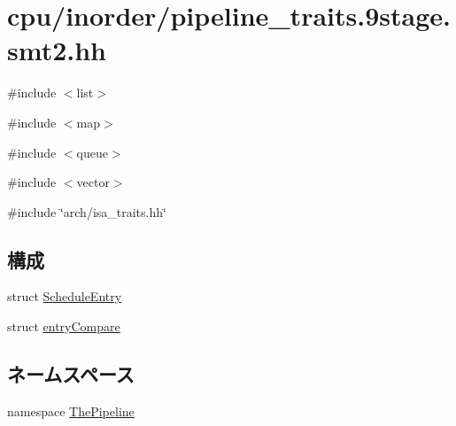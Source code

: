 \hypertarget{pipeline__traits_89stage_8smt2_8hh}{
\section{cpu/inorder/pipeline\_\-traits.9stage.smt2.hh}
\label{pipeline__traits_89stage_8smt2_8hh}
}
{\ttfamily \#include $<$list$>$}\par
{\ttfamily \#include $<$map$>$}\par
{\ttfamily \#include $<$queue$>$}\par
{\ttfamily \#include $<$vector$>$}\par
{\ttfamily \#include \char`\"{}arch/isa\_\-traits.hh\char`\"{}}\par
\subsection*{構成}
\begin{DoxyCompactItemize}
\item 
struct \hyperlink{structThePipeline_1_1ScheduleEntry}{ScheduleEntry}
\item 
struct \hyperlink{structThePipeline_1_1entryCompare}{entryCompare}
\end{DoxyCompactItemize}
\subsection*{ネームスペース}
\begin{DoxyCompactItemize}
\item 
namespace \hyperlink{namespaceThePipeline}{ThePipeline}
\end{DoxyCompactItemize}
